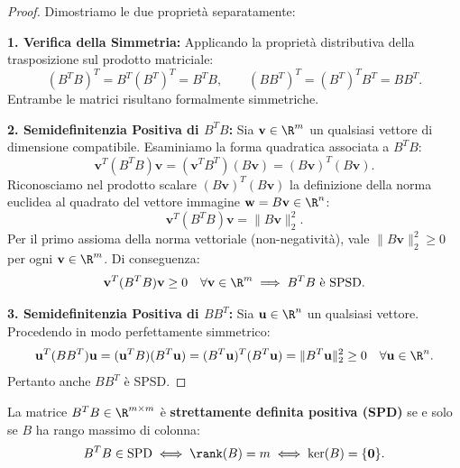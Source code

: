 \begin{proof}
Dimostriamo le due propriet\`a separatamente:

\medskip
\noindent\textbf{1. Verifica della Simmetria:}
Applicando la propriet\`a distributiva della trasposizione sul prodotto matriciale:
\begin{equation}
    (B^T B)^T = B^T (B^T)^T = B^T B, \qquad (B B^T)^T = (B^T)^T B^T = B B^T.
\end{equation}
Entrambe le matrici risultano formalmente simmetriche.

\medskip
\noindent\textbf{2. Semidefinitenzia Positiva di $B^T B$:}
Sia $\mathbf{v} \in \R^m$ un qualsiasi vettore di dimensione compatibile. Esaminiamo la forma quadratica associata a $B^T B$:
\begin{equation}
    \mathbf{v}^T (B^T B) \mathbf{v} = (\mathbf{v}^T B^T)(B \mathbf{v}) = (B \mathbf{v})^T (B \mathbf{v}).
\end{equation}
Riconosciamo nel prodotto scalare $(B\mathbf{v})^T (B\mathbf{v})$ la definizione della norma euclidea al quadrato del vettore immagine $\mathbf{w} = B\mathbf{v} \in \R^n$:
\begin{equation}
    \mathbf{v}^T (B^T B) \mathbf{v} = \|B \mathbf{v}\|_2^2.
\end{equation}
Per il primo assioma della norma vettoriale (non-negativit\`a), vale $\|B \mathbf{v}\|_2^2 \ge 0$ per ogni $\mathbf{v} \in \R^m$. Di conseguenza:
\begin{equation}
    \mathbf{v}^T (B^T B) \mathbf{v} \ge 0 \quad \forall \mathbf{v} \in \R^m \implies B^T B \text{ \`e SPSD}.
\end{equation}

\medskip
\noindent\textbf{3. Semidefinitenzia Positiva di $B B^T$:}
Sia $\mathbf{u} \in \R^n$ un qualsiasi vettore. Procedendo in modo perfettamente simmetrico:
\begin{equation}
    \mathbf{u}^T (B B^T) \mathbf{u} = (\mathbf{u}^T B)(B^T \mathbf{u}) = (B^T \mathbf{u})^T (B^T \mathbf{u}) = \|B^T \mathbf{u}\|_2^2 \ge 0 \quad \forall \mathbf{u} \in \R^n.
\end{equation}
Pertanto anche $B B^T$ \`e SPSD.
\end{proof}

\begin{corollary}
La matrice $B^T B \in \R^{m \times m}$ \`e \textbf{strettamente definita positiva (SPD)} se e solo se $B$ ha rango massimo di colonna:
\begin{equation}
    B^T B \in \text{SPD} \iff \rank(B) = m \iff \ker(B) = \{\mathbf{0}\}.
\end{equation}
\end{corollary}

